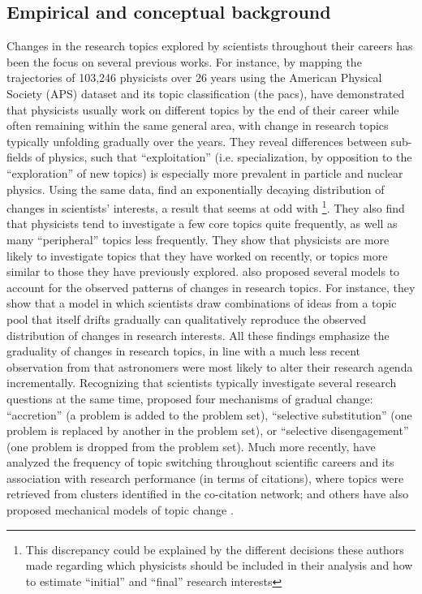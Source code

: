 \documentclass{article}
\begin{document}
\subsection{\label{sec:conceptual}Empirical and conceptual background}

Changes in the research topics explored by scientists throughout their careers has been the focus on several previous works. For instance, by mapping the trajectories of 103,246 physicists over 26 years using the American Physical Society (APS) dataset and its topic classification (the \gls{pacs}), \citet{Aleta2019} have demonstrated that physicists usually work on different topics by the end of their career while often remaining within the same general area, with change in research topics typically unfolding gradually over the years. They reveal differences between sub-fields of physics, such that ``exploitation'' (i.e. specialization, by opposition to the ``exploration'' of new topics) is especially more prevalent in particle and nuclear physics.  Using the same data, \citet{Jia2017} find an exponentially decaying distribution of changes in scientists' interests, a result that seems at odd with \citealt{Aleta2019}\footnote{This discrepancy could be explained by the different decisions these authors made regarding which physicists should be included in their analysis and how to estimate ``initial'' and ``final'' research interests}. They also find that physicists tend to investigate a few core topics quite frequently, as well as many ``peripheral'' topics less frequently. They show that physicists are more likely to investigate topics that they have worked on recently, or topics more similar to those they have previously explored. \citet{Jia2017} also proposed several models to account for the observed patterns of changes in research topics. For instance, they show that a model in which scientists draw combinations of ideas from a topic pool that itself drifts gradually can qualitatively reproduce the observed distribution of changes in research interests. All these findings emphasize the graduality of changes in research topics, in line with a much less recent observation from \citet{Gieryn1978} that astronomers were most likely to alter their research agenda incrementally. Recognizing that scientists typically investigate several research questions at the same time, \citeauthor{Gieryn1978} proposed four mechanisms of gradual change: ``accretion'' (a problem is added to the problem set),  ``selective substitution'' (one problem is replaced by another in the problem set), or ``selective disengagement'' (one problem is dropped from the problem set). Much more recently, \citet{Zeng2019} have analyzed the frequency of topic switching throughout scientific careers and its association with research performance (in terms of citations), where topics were retrieved from clusters identified in the co-citation network; and others have also proposed mechanical models of topic change \citep{Chakresh2023,Feifan2023}.
\end{document}
